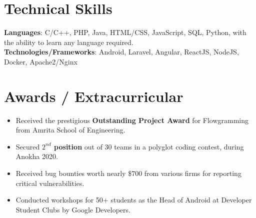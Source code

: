 \documentclass[letterpaper,11pt]{article}
\newcommand{\resumeItem}[1]{
  \item\small{
    {#1 \vspace{-2pt}}
  }
}
\newcommand{\resumeItemListStart}{\begin{itemize}}
\newcommand{\resumeItemListEnd}{\end{itemize}\vspace{-5pt}}
\begin{document}
%
\section{Technical Skills}
 \begin{itemize}[leftmargin=0.15in, label={}]
    \small{\item{
     \textbf{Languages}{: C/C++, PHP, Java, HTML/CSS, JavaScript, SQL, Python, with the ability to learn any language required.} \\
     \textbf{Technologies/Frameworks}{: Android, Laravel, Angular, ReactJS, NodeJS, Docker, Apache2/Nginx} \\
    }}
 \end{itemize}
 \vspace{-16pt}


\section{Awards / Extracurricular}
            \resumeItemListStart
            	\resumeItem{Received the prestigious \textbf{Outstanding Project Award} for Flowgramming from Amrita School of Engineering.}\vspace{-5pt}
                \resumeItem{Secured \textbf{{$2^{nd}$} position} out of 30 teams in a polyglot coding contest, during Anokha 2020.}\vspace{-5pt}
                \resumeItem{Received bug bounties worth nearly \$700 from various firms for reporting critical vulnerabilities.}\vspace{-5pt}
                \resumeItem{Conducted workshops for 50+ students as the Head of Android at Developer Student Clubs by Google Developers.}\vspace{-5pt}
            \resumeItemListEnd
\end{document}
